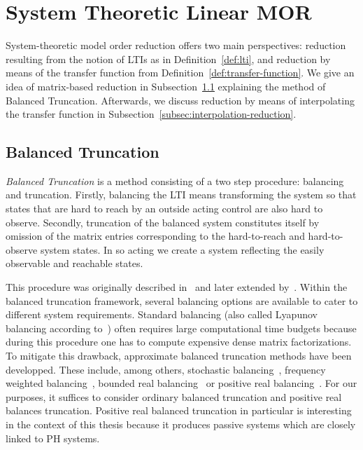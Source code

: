\section{System Theoretic Linear MOR}\label{sec:system-mor}

System-theoretic model order reduction offers two main perspectives: reduction resulting from the notion of \acp{LTI} as in Definition~\ref{def:lti}, and reduction by means of the transfer function from Definition~\ref{def:transfer-function}.
We give an idea of matrix-based reduction in Subsection~\ref{subsec:balanced-truncation} explaining the method of Balanced Truncation.
Afterwards, we discuss reduction by means of interpolating the transfer function in Subsection~\ref{subsec:interpolation-reduction}.

\subsection{Balanced Truncation}\label{subsec:balanced-truncation}

\emph{Balanced Truncation} is a method consisting of a two step procedure: balancing and truncation.
Firstly, balancing the \ac{LTI} means transforming the system so that states that are hard to reach by an outside acting control are also hard to observe.
Secondly, truncation of the balanced system constitutes itself by omission of the matrix entries corresponding to the hard-to-reach and hard-to-observe system states.
In so acting we create a system reflecting the easily observable and reachable states.

This procedure was originally described in~\cite{Mullis1976} and later extended by~\cite{Moore1981, Enns1984}.
Within the balanced truncation framework, several balancing options are available to cater to different system requirements.
Standard balancing (also called Lyapunov balancing according to~\cite{Gugercin2007}) often requires large computational time budgets because during this procedure one has to compute expensive dense matrix factorizations.
To mitigate this drawback, approximate balanced truncation methods have been developped.
These include, among others, stochastic balancing~\cite{Desai1984, Green1988}, frequency weighted balancing~\cite{Enns1984, Wang1999}, bounded real balancing~\cite{Opdenacker1988, Reis2009} or positive real balancing~\cite{Desai1984, Ober1991}.
For our purposes, it suffices to consider ordinary balanced truncation and positive real balances truncation.
Positive real balanced truncation in particular is interesting in the context of this thesis because it produces passive systems which are closely linked to \ac{PH} systems.

